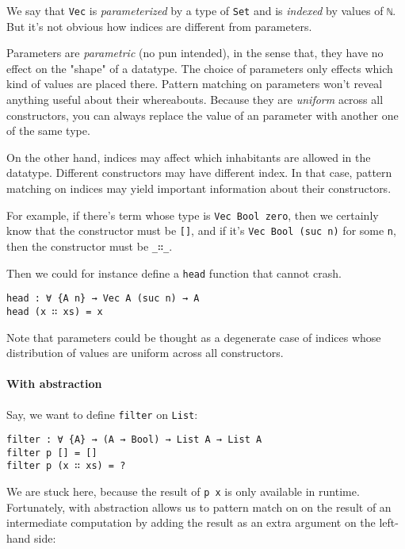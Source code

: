 \documentclass[12pt, a4paper]{article}
\begin{document}
We say that {\lstinline|Vec|} is \textit{parameterized} by a type of {\lstinline|Set|}
and is \textit{indexed} by values of {\lstinline|ℕ|}. But it's not obvious how indices are
different from parameters.

Parameters are \textit{parametric} (no pun intended), in the sense that, they
have no effect on the "shape" of a datatype. The choice of parameters only effects
which kind of values are placed there. Pattern matching on parameters won't reveal
anything useful about their whereabouts. Because they are \textit{uniform} across
all constructors, you can always replace the value of an parameter with another one
of the same type.

On the other hand, indices may affect which inhabitants are allowed in the
datatype. Different constructors may have different index. In that case, pattern
matching on indices may yield important information about their constructors.

For example, if there's term whose type is {\lstinline|Vec Bool zero|}, then
we certainly know that the constructor must be {\lstinline|[]|}, and if it's
{\lstinline|Vec Bool (suc n)|} for some {\lstinline|n|}, then the constructor
must be {\lstinline|_∷_|}.

Then we could for instance define a {\lstinline|head|} function that cannot crash.

\begin{lstlisting}
head : ∀ {A n} → Vec A (suc n) → A
head (x ∷ xs) = x
\end{lstlisting}

Note that parameters could be thought as a degenerate case of indices whose distribution
of values are uniform across all constructors.

\paragraph{With abstraction}

Say, we want to define {\lstinline|filter|} on {\lstinline|List|}:

\begin{lstlisting}
filter : ∀ {A} → (A → Bool) → List A → List A
filter p [] = []
filter p (x ∷ xs) = ?
\end{lstlisting}

We are stuck here, because the result of {\lstinline|p x|} is only available in
runtime. Fortunately, with abstraction allows us to pattern match on on the result
of an intermediate computation by adding the result as an extra argument on the
left-hand side:
\end{document}
